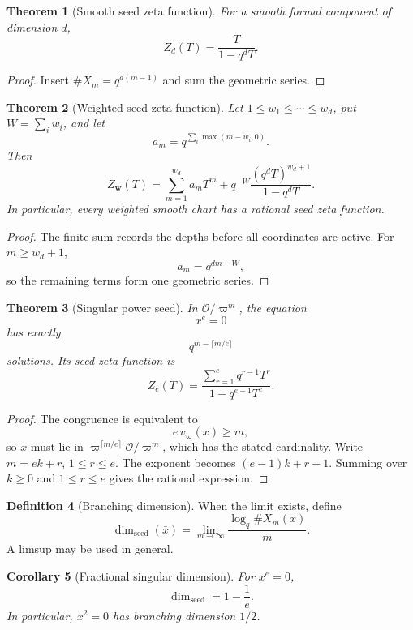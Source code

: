 \documentclass[11pt]{article}
\newtheorem{theorem}{Theorem}[section]
\newtheorem{corollary}[theorem]{Corollary}
\theoremstyle{definition}
\newtheorem{definition}[theorem]{Definition}
\theoremstyle{remark}
\newcommand{\Ocal}{\mathcal O}
\begin{document}
\begin{theorem}[Smooth seed zeta function]
For a smooth formal component of dimension \(d\),
\[
\boxed{
Z_d(T)=\frac{T}{1-q^dT}.
}
\]
\end{theorem}

\begin{proof}
Insert \(\#X_m=q^{d(m-1)}\) and sum the geometric series.
\end{proof}

\begin{theorem}[Weighted seed zeta function]
Let \(1\le w_1\le\cdots\le w_d\), put \(W=\sum_iw_i\), and let
\[
a_m=q^{\sum_i\max(m-w_i,0)}.
\]
Then
\[
\boxed{
Z_{\bm w}(T)
=
\sum_{m=1}^{w_d}a_mT^m
+
q^{-W}\frac{(q^dT)^{w_d+1}}{1-q^dT}.
}
\]
In particular, every weighted smooth chart has a rational seed zeta function.
\end{theorem}

\begin{proof}
The finite sum records the depths before all coordinates are active.  For \(m\ge w_d+1\),
\[
a_m=q^{dm-W},
\]
so the remaining terms form one geometric series.
\end{proof}

\begin{theorem}[Singular power seed]
In \(\Ocal/\varpi^m\), the equation
\[
x^e=0
\]
has exactly
\[
\boxed{
q^{m-\lceil m/e\rceil}
}
\]
solutions.  Its seed zeta function is
\[
\boxed{
Z_e(T)
=
\frac{\sum_{r=1}^{e}q^{r-1}T^r}
{1-q^{e-1}T^e}.
}
\]
\end{theorem}

\begin{proof}
The congruence is equivalent to
\[
e\,v_\varpi(x)\ge m,
\]
so \(x\) must lie in \(\varpi^{\lceil m/e\rceil}\Ocal/\varpi^m\), which has the stated cardinality.  Write \(m=ek+r\), \(1\le r\le e\).  The exponent becomes \((e-1)k+r-1\).  Summing over \(k\ge0\) and \(1\le r\le e\) gives the rational expression.
\end{proof}

\begin{definition}[Branching dimension]
When the limit exists, define
\[
\dim_{\mathrm{seed}}(\bar x)
=
\lim_{m\to\infty}
\frac{\log_q\#X_m(\bar x)}{m}.
\]
A limsup may be used in general.
\end{definition}

\begin{corollary}[Fractional singular dimension]
For \(x^e=0\),
\[
\boxed{
\dim_{\mathrm{seed}}=1-\frac1e.
}
\]
In particular, \(x^2=0\) has branching dimension \(1/2\).
\end{corollary}
\end{document}
